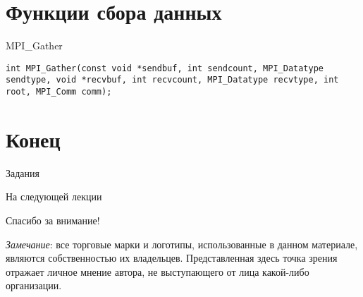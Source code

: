 

\section{Функции сбора данных}

\begin{frame}[fragile]{MPI_Gather}

\begin{lstlisting}
int MPI_Gather(const void *sendbuf, int sendcount, MPI_Datatype sendtype, void *recvbuf, int recvcount, MPI_Datatype recvtype, int root, MPI_Comm comm);
\end{lstlisting}

\end{frame}

\begin{frame}

\begin{figure}[htp]
    \centering
\end{figure}

\end{frame}

\section{Конец}

\begin{frame}{Задания}
\end{frame}

\begin{frame}{На следующей лекции}
\end{frame}

\begin{frame}

{\huge{Спасибо за внимание!}\par}

\vfill

\tiny{\textit{Замечание}: все торговые марки и логотипы, использованные в данном материале, являются собственностью их владельцев. Представленная здесь точка зрения отражает личное мнение автора, не выступающего от лица какой-либо организации.}

\end{frame}


